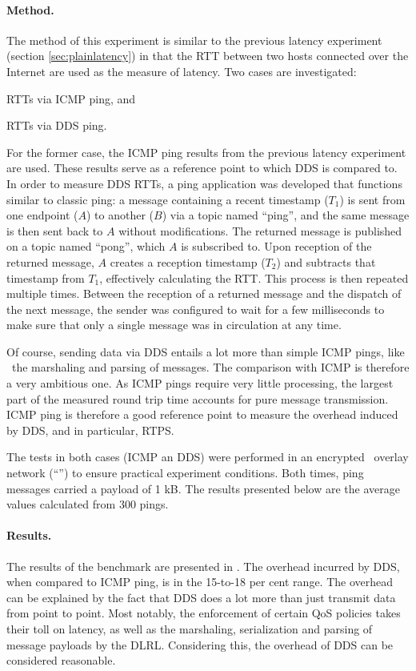 \paragraph{Method.} The method of this experiment is similar to the previous latency experiment (section \ref{sec:plainlatency}) in that the RTT between two hosts connected over the Internet are used as the measure of latency. Two cases are investigated:
\begin{inparaenum}[(i)]
	\item RTTs via ICMP ping, and
	\item RTTs via DDS ping.
\end{inparaenum}
For the former case, the ICMP ping results from the previous latency experiment are used. These results serve as a reference point to which DDS is compared to. In order to measure DDS RTTs, a ping application was developed that functions similar to classic ping: a message containing a recent timestamp ($T_1$) is sent from one endpoint ($A$) to another ($B$) via a topic named ``ping'', and the same message is then sent back to $A$ without modifications. The returned message is published on a topic named ``pong'', which $A$ is subscribed to. Upon reception of the returned message, $A$ creates a reception timestamp ($T_2$) and subtracts that timestamp from $T_1$, effectively calculating the RTT. This process is then repeated multiple times. Between the reception of a returned message and the dispatch of the next message, the sender was configured to wait for a few milliseconds to make sure that only a single message was in circulation at any time.

Of course, sending data via DDS entails a lot more than simple ICMP pings, like \eg\ the marshaling and parsing of messages. The comparison with ICMP is therefore a very ambitious one. As ICMP pings require very little processing, the largest part of the measured round trip time accounts for pure message transmission. ICMP ping is therefore a good reference point to measure the overhead induced by DDS, and in particular, RTPS.

The tests in both cases (ICMP an DDS) were performed in an encrypted \wnet\ overlay network (``'') to ensure practical experiment conditions. Both times, ping messages carried a payload of 1 kB. The results presented below are the average values calculated from 300 pings.


\paragraph{Results.}
The results of the benchmark are presented in . The overhead incurred by DDS, when compared to ICMP ping, is in the 15-to-18 per cent range. The overhead can be explained by the fact that DDS does a lot more than just transmit data from point to point. Most notably, the enforcement of certain QoS policies takes their toll on latency, as well as the marshaling, serialization and parsing of message payloads by the DLRL. Considering this, the overhead of DDS can be considered reasonable.

